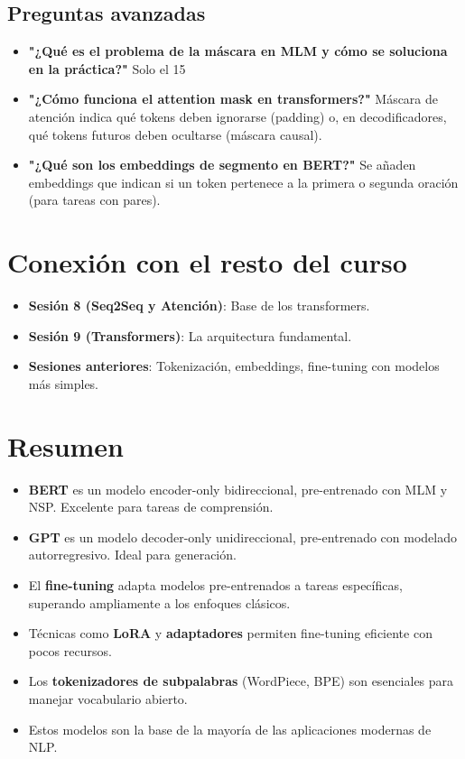\documentclass[12pt,a4paper,openany,oneside]{book}
\begin{document}
\subsection{Preguntas avanzadas}
\begin{itemize}
    \item \textbf{"¿Qué es el problema de la máscara en MLM y cómo se soluciona en la práctica?"}
    Solo el 15%
    
    \item \textbf{"¿Cómo funciona el attention mask en transformers?"}
    Máscara de atención indica qué tokens deben ignorarse (padding) o, en decodificadores, qué tokens futuros deben ocultarse (máscara causal).
    
    \item \textbf{"¿Qué son los embeddings de segmento en BERT?"}
    Se añaden embeddings que indican si un token pertenece a la primera o segunda oración (para tareas con pares).
\end{itemize}

\section{Conexión con el resto del curso}
\begin{itemize}
    \item \textbf{Sesión 8 (Seq2Seq y Atención)}: Base de los transformers.
    \item \textbf{Sesión 9 (Transformers)}: La arquitectura fundamental.
    \item \textbf{Sesiones anteriores}: Tokenización, embeddings, fine-tuning con modelos más simples.
\end{itemize}

\section{Resumen}
\begin{itemize}
    \item \textbf{BERT} es un modelo encoder-only bidireccional, pre-entrenado con MLM y NSP. Excelente para tareas de comprensión.
    \item \textbf{GPT} es un modelo decoder-only unidireccional, pre-entrenado con modelado autorregresivo. Ideal para generación.
    \item El \textbf{fine-tuning} adapta modelos pre-entrenados a tareas específicas, superando ampliamente a los enfoques clásicos.
    \item Técnicas como \textbf{LoRA} y \textbf{adaptadores} permiten fine-tuning eficiente con pocos recursos.
    \item Los \textbf{tokenizadores de subpalabras} (WordPiece, BPE) son esenciales para manejar vocabulario abierto.
    \item Estos modelos son la base de la mayoría de las aplicaciones modernas de NLP.
\end{itemize}
\end{document}
